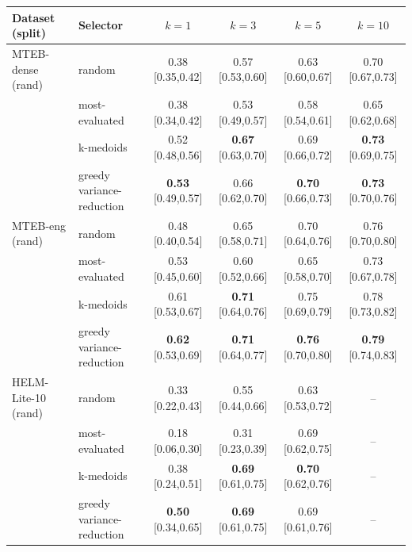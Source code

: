 \begin{tabular}{llcccc}\toprule
Dataset (split) & Selector & $k{=}1$ & $k{=}3$ & $k{=}5$ & $k{=}10$ \\\midrule
MTEB-dense (rand) & random & 0.38 \scriptsize[0.35,0.42] & 0.57 \scriptsize[0.53,0.60] & 0.63 \scriptsize[0.60,0.67] & 0.70 \scriptsize[0.67,0.73] \\
 & most-evaluated & 0.38 \scriptsize[0.34,0.42] & 0.53 \scriptsize[0.49,0.57] & 0.58 \scriptsize[0.54,0.61] & 0.65 \scriptsize[0.62,0.68] \\
 & k-medoids & 0.52 \scriptsize[0.48,0.56] & \textbf{0.67} \scriptsize[0.63,0.70] & 0.69 \scriptsize[0.66,0.72] & \textbf{0.73} \scriptsize[0.69,0.75] \\
 & greedy variance-reduction & \textbf{0.53} \scriptsize[0.49,0.57] & 0.66 \scriptsize[0.62,0.70] & \textbf{0.70} \scriptsize[0.66,0.73] & \textbf{0.73} \scriptsize[0.70,0.76] \\
\midrule
MTEB-eng (rand) & random & 0.48 \scriptsize[0.40,0.54] & 0.65 \scriptsize[0.58,0.71] & 0.70 \scriptsize[0.64,0.76] & 0.76 \scriptsize[0.70,0.80] \\
 & most-evaluated & 0.53 \scriptsize[0.45,0.60] & 0.60 \scriptsize[0.52,0.66] & 0.65 \scriptsize[0.58,0.70] & 0.73 \scriptsize[0.67,0.78] \\
 & k-medoids & 0.61 \scriptsize[0.53,0.67] & \textbf{0.71} \scriptsize[0.64,0.76] & 0.75 \scriptsize[0.69,0.79] & 0.78 \scriptsize[0.73,0.82] \\
 & greedy variance-reduction & \textbf{0.62} \scriptsize[0.53,0.69] & \textbf{0.71} \scriptsize[0.64,0.77] & \textbf{0.76} \scriptsize[0.70,0.80] & \textbf{0.79} \scriptsize[0.74,0.83] \\
\midrule
HELM-Lite-10 (rand) & random & 0.33 \scriptsize[0.22,0.43] & 0.55 \scriptsize[0.44,0.66] & 0.63 \scriptsize[0.53,0.72] & -- \\
 & most-evaluated & 0.18 \scriptsize[0.06,0.30] & 0.31 \scriptsize[0.23,0.39] & 0.69 \scriptsize[0.62,0.75] & -- \\
 & k-medoids & 0.38 \scriptsize[0.24,0.51] & \textbf{0.69} \scriptsize[0.61,0.75] & \textbf{0.70} \scriptsize[0.62,0.76] & -- \\
 & greedy variance-reduction & \textbf{0.50} \scriptsize[0.34,0.65] & \textbf{0.69} \scriptsize[0.61,0.75] & 0.69 \scriptsize[0.61,0.76] & -- \\
\bottomrule
\end{tabular}
